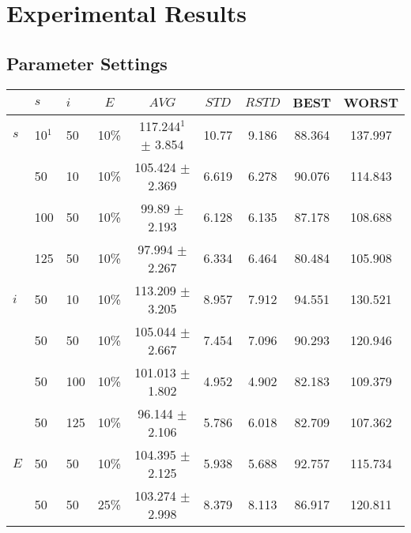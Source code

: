 \chapter{Experimental Results}
\label{appendixC}

\section{Parameter Settings}

\begin{sidewaystable}
    \centering
    \begin{tabular}{|l|l|l|c||c|c|c|c|c|}
    \hline
    ~ & $s$ & $i$ & $E$ & $AVG$ & $STD$ & $RSTD$ & BEST & WORST \\
    \hline
    $s$ & 10$^1$ & 50 & 10\% & 117.244$^1$ $\pm$ 3.854 & 10.77 & 9.186 & 88.364 & 137.997\\
    ~ & 50 & 10 & 10\% & 105.424 $\pm$ 2.369 & 6.619 & 6.278 & 90.076 & 114.843\\
    ~ & 100 & 50 & 10\% & 99.89 $\pm$ 2.193 & 6.128 & 6.135 & 87.178 & 108.688\\
    ~ & 125 & 50 & 10\% & 97.994 $\pm$ 2.267 & 6.334 & 6.464 & 80.484 & 105.908\\
    \hline
    $i$ & 50 & 10 & 10\% & 113.209 $\pm$ 3.205 & 8.957 & 7.912 & 94.551 & 130.521\\
    ~ & 50 & 50 & 10\% & 105.044 $\pm$ 2.667 & 7.454 & 7.096 & 90.293 & 120.946\\
    ~ & 50 & 100 & 10\% & 101.013 $\pm$ 1.802 & 4.952 & 4.902 & 82.183 & 109.379\\
    ~ & 50 & 125 & 10\% & 96.144 $\pm$ 2.106 & 5.786 & 6.018 & 82.709 & 107.362\\
    \hline
    $E$ & 50 & 50 & 10\% & 104.395 $\pm$ 2.125 & 5.938 & 5.688 & 92.757 & 115.734\\
    ~ & 50 & 50 & 25\% & 103.274 $\pm$ 2.998 & 8.379 & 8.113 & 86.917 & 120.811\\

\end{tabular}
\end{sidewaystable}
